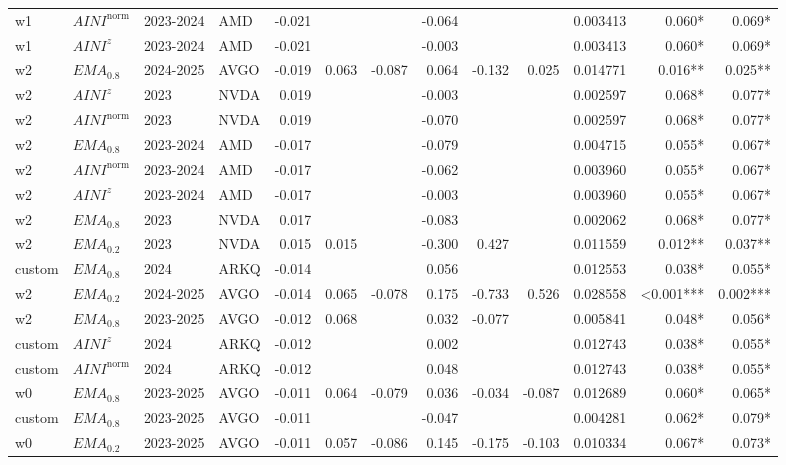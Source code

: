 \begin{longtable}{@{}llllrrrrrrrrr@{}}
w1 & $AINI^{\mathrm{norm}}$ & 2023-2024 & AMD & -0.021 &  &  & -0.064 &  &  & 0.003413 & 0.060* & 0.069* \\
w1 & $AINI^{z}$ & 2023-2024 & AMD & -0.021 &  &  & -0.003 &  &  & 0.003413 & 0.060* & 0.069* \\
w2 & $EMA_{0.8}$ & 2024-2025 & AVGO & -0.019 & 0.063 & -0.087 & 0.064 & -0.132 & 0.025 & 0.014771 & 0.016** & 0.025** \\
w2 & $AINI^{z}$ & 2023 & NVDA & 0.019 &  &  & -0.003 &  &  & 0.002597 & 0.068* & 0.077* \\
w2 & $AINI^{\mathrm{norm}}$ & 2023 & NVDA & 0.019 &  &  & -0.070 &  &  & 0.002597 & 0.068* & 0.077* \\
w2 & $EMA_{0.8}$ & 2023-2024 & AMD & -0.017 &  &  & -0.079 &  &  & 0.004715 & 0.055* & 0.067* \\
w2 & $AINI^{\mathrm{norm}}$ & 2023-2024 & AMD & -0.017 &  &  & -0.062 &  &  & 0.003960 & 0.055* & 0.067* \\
w2 & $AINI^{z}$ & 2023-2024 & AMD & -0.017 &  &  & -0.003 &  &  & 0.003960 & 0.055* & 0.067* \\
w2 & $EMA_{0.8}$ & 2023 & NVDA & 0.017 &  &  & -0.083 &  &  & 0.002062 & 0.068* & 0.077* \\
w2 & $EMA_{0.2}$ & 2023 & NVDA & 0.015 & 0.015 &  & -0.300 & 0.427 &  & 0.011559 & 0.012** & 0.037** \\
custom & $EMA_{0.8}$ & 2024 & ARKQ & -0.014 &  &  & 0.056 &  &  & 0.012553 & 0.038* & 0.055* \\
w2 & $EMA_{0.2}$ & 2024-2025 & AVGO & -0.014 & 0.065 & -0.078 & 0.175 & -0.733 & 0.526 & 0.028558 & \textless{}0.001*** & 0.002*** \\
w2 & $EMA_{0.8}$ & 2023-2025 & AVGO & -0.012 & 0.068 &  & 0.032 & -0.077 &  & 0.005841 & 0.048* & 0.056* \\
custom & $AINI^{z}$ & 2024 & ARKQ & -0.012 &  &  & 0.002 &  &  & 0.012743 & 0.038* & 0.055* \\
custom & $AINI^{\mathrm{norm}}$ & 2024 & ARKQ & -0.012 &  &  & 0.048 &  &  & 0.012743 & 0.038* & 0.055* \\
w0 & $EMA_{0.8}$ & 2023-2025 & AVGO & -0.011 & 0.064 & -0.079 & 0.036 & -0.034 & -0.087 & 0.012689 & 0.060* & 0.065* \\
custom & $EMA_{0.8}$ & 2023-2025 & AVGO & -0.011 &  &  & -0.047 &  &  & 0.004281 & 0.062* & 0.079* \\
w0 & $EMA_{0.2}$ & 2023-2025 & AVGO & -0.011 & 0.057 & -0.086 & 0.145 & -0.175 & -0.103 & 0.010334 & 0.067* & 0.073* \\

\end{longtable}
